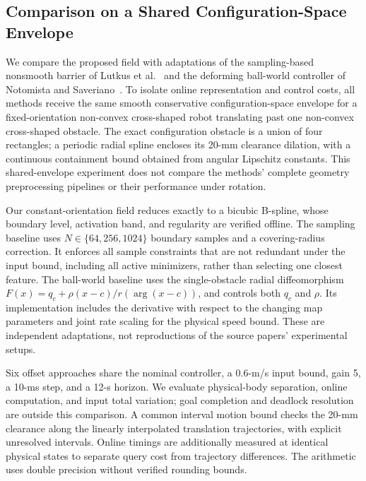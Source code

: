 \documentclass[journal]{IEEEtran}
\theoremstyle{definition}
\begin{document}
\subsection{Comparison on a Shared Configuration-Space Envelope}
\label{sec:three-baselines}
We compare the proposed field with adaptations of the sampling-based nonsmooth
barrier of Lutkus et al.~\cite{lutkus2025sampling} and the deforming ball-world
controller of Notomista and Saveriano~\cite{notomista2021nonconvex}.
To isolate online representation and control costs, all methods receive the same
smooth conservative configuration-space envelope for a fixed-orientation
non-convex cross-shaped robot translating past one non-convex cross-shaped
obstacle. The exact configuration obstacle is a union of four rectangles; a
periodic radial spline encloses its 20-mm clearance dilation, with a continuous
containment bound obtained from angular Lipschitz constants.
This shared-envelope experiment does not compare the methods' complete geometry
preprocessing pipelines or their performance under rotation.

Our constant-orientation field reduces exactly to a bicubic B-spline, whose
boundary level, activation band, and regularity are verified offline.
The sampling baseline uses $N\in\{64,256,1024\}$ boundary samples and a
covering-radius correction. It enforces all sample constraints that are not
redundant under the input bound, including all active minimizers, rather than
selecting one closest feature. The ball-world baseline uses the single-obstacle
radial diffeomorphism $F(x)=q_c+\rho(x-c)/r(\arg(x-c))$, and controls both
$q_c$ and $\rho$. Its implementation includes the derivative with respect to
the changing map parameters and joint rate scaling for the physical speed
bound. These are independent adaptations, not reproductions of the source
papers' experimental setups.

Six offset approaches share the nominal controller, a 0.6-m/s input bound,
gain 5, a 10-ms step, and a 12-s horizon. We evaluate physical-body separation,
online computation, and input total variation; goal completion and deadlock
resolution are outside this comparison. A common interval motion bound checks
the 20-mm clearance along the linearly interpolated translation trajectories,
with explicit unresolved intervals. Online timings are additionally measured
at identical physical states to separate query cost from trajectory differences.
The arithmetic uses double precision without verified rounding bounds.
\end{document}
